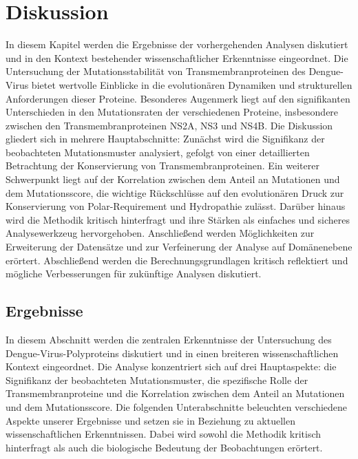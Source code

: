 \documentclass[german,version-2022-01]{uzl-thesis}
\begin{document}
\chapter{Diskussion}
In diesem Kapitel werden die Ergebnisse der vorhergehenden Analysen diskutiert und in den Kontext bestehender wissenschaftlicher Erkenntnisse eingeordnet. Die Untersuchung der Mutationsstabilit\"at von Transmembranproteinen des Dengue-Virus bietet wertvolle Einblicke in die evolution\"aren Dynamiken und strukturellen Anforderungen dieser Proteine. Besonderes Augenmerk liegt auf den signifikanten Unterschieden in den Mutationsraten der verschiedenen Proteine, insbesondere zwischen den Transmembranproteinen NS2A, NS3 und NS4B. Die Diskussion gliedert sich in mehrere Hauptabschnitte: Zun\"achst wird die Signifikanz der beobachteten Mutationsmuster analysiert, gefolgt von einer detaillierten Betrachtung der Konservierung von Transmembranproteinen. Ein weiterer Schwerpunkt liegt auf der Korrelation zwischen dem Anteil an Mutationen und dem Mutationsscore, die wichtige R\"uckschl\"usse auf den evolution\"aren Druck zur Konservierung von Polar-Requirement und Hydropathie zul\"asst. Dar\"uber hinaus wird die Methodik kritisch hinterfragt und ihre St\"arken als einfaches und sicheres Analysewerkzeug hervorgehoben. Anschlie\ss{}end werden M\"oglichkeiten zur Erweiterung der Datens\"atze und zur Verfeinerung der Analyse auf Dom\"anenebene er\"ortert. Abschlie\ss{}end werden die Berechnungsgrundlagen kritisch reflektiert und m\"ogliche Verbesserungen f\"ur zuk\"unftige Analysen diskutiert.

\section{Ergebnisse}
In diesem Abschnitt werden die zentralen Erkenntnisse der Untersuchung des Dengue-Virus-Polyproteins diskutiert und in einen breiteren wissenschaftlichen Kontext eingeordnet. Die Analyse konzentriert sich auf drei Hauptaspekte: die Signifikanz der beobachteten Mutationsmuster, die spezifische Rolle der Transmembranproteine und die Korrelation zwischen dem Anteil an Mutationen und dem Mutationsscore. Die folgenden Unterabschnitte beleuchten verschiedene Aspekte unserer Ergebnisse und setzen sie in Beziehung zu aktuellen wissenschaftlichen Erkenntnissen. Dabei wird sowohl die Methodik kritisch hinterfragt als auch die biologische Bedeutung der Beobachtungen er\"ortert.
\end{document}
